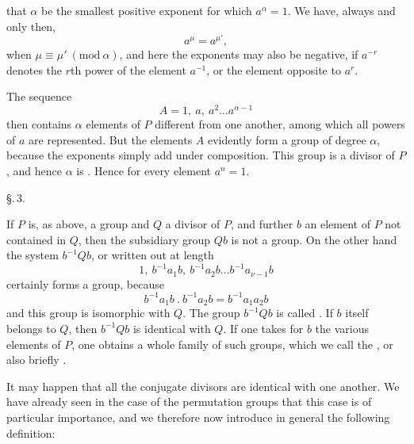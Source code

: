 
that $\alpha$ be the smallest positive exponent for which $a^\alpha = 1$.
We have, always and only then,
\[
a^\mu = a^{\mu'},
\]
when $\mu \equiv \mu'\ (\mathrm{mod}\ \alpha)$, and here the exponents may
also be negative, if $a^{-r}$ denotes the $r$th power of the element
$a^{-1}$, or the element opposite to $a^r$.

The sequence
\[
A = 1,\ a,\ a^2 \ldots a^{\alpha-1}
\]
then contains $\alpha$ elements of $P$ different from one another, among
which all powers of $a$ are represented. But the elements $A$ evidently
form a group of degree $\alpha$, because the exponents simply add under
composition. This group is a divisor of $P$, and hence $\alpha$ is
. Hence for every element $a^n = 1$.


\begin{center}
\S.\,3.

\end{center}

If $P$ is, as above, a group and $Q$ a divisor of $P$, and further $b$ an
element of $P$ not contained in $Q$, then the subsidiary group $Qb$ is not
a group. On the other hand the system $b^{-1}Qb$, or written out at
length
\[
1,\ b^{-1}a_1 b,\ b^{-1}a_2 b \ldots b^{-1}a_{\nu-1} b
\]
certainly forms a group, because
\[
b^{-1}a_1 b\ .\ b^{-1}a_2 b = b^{-1}a_1 a_2 b
\]
and this group is isomorphic with $Q$. The group $b^{-1}Qb$ is called
. If $b$ itself belongs to $Q$, then
$b^{-1}Qb$ is identical with $Q$. If one takes for $b$ the various
elements of $P$, one obtains a whole family of such groups, which we call
the , or also briefly .

It may happen that all the conjugate divisors are identical with one
another. We have already seen in the case of the permutation groups that
this case is of particular importance, and we therefore now introduce in
general the following definition:

